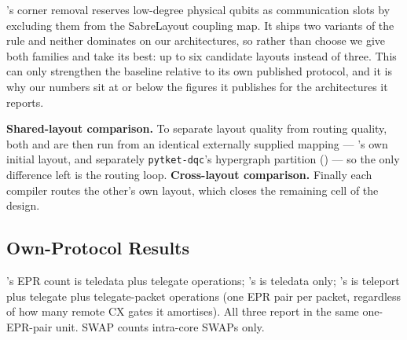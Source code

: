 \dSABRE{}'s corner removal reserves low-degree physical qubits as
communication slots by excluding them from the SabreLayout coupling map.
It ships two variants of the rule and neither dominates on our
architectures, so rather than choose we give \dSABRE{} both families and
take its best: up to six candidate layouts instead of three. This can
only strengthen the baseline relative to its own published protocol, and
it is why our \dSABRE{} numbers sit at or below the figures it publishes
for the architectures it reports.

\textbf{Shared-layout comparison.} To separate layout quality from
routing quality, both \dSABRE{} and \PORTER{} are then run from an
identical externally supplied mapping --- \TeleSABRE{}'s own initial
layout, and separately \texttt{pytket-dqc}'s hypergraph partition
(\appPytket{}) --- so the only difference left is the routing loop.
\textbf{Cross-layout comparison.} Finally each compiler routes the
other's own layout, which closes the remaining cell of the design.

\subsection{Own-Protocol Results}
\label{sec:main_results}

\TeleSABRE{}'s EPR count is teledata plus telegate operations;
\dSABRE{}'s is teledata only; \PORTER{}'s is teleport plus telegate
plus telegate-packet operations (one EPR pair per packet, regardless
of how many remote CX gates it amortises). All three report in the
same one-EPR-pair unit. SWAP counts intra-core SWAPs only.


